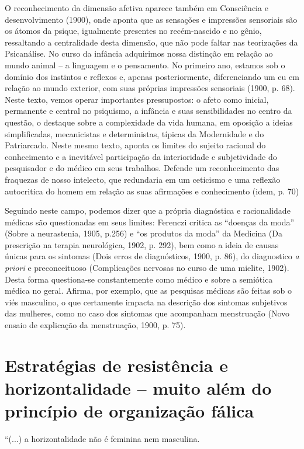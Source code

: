 O reconhecimento da dimensão afetiva aparece também em Consciência e
desenvolvimento (1900), onde aponta que as sensações e impressões
sensoriais são os átomos da psique, igualmente presentes no
recém-nascido e no gênio, ressaltando a centralidade desta dimensão, que
não pode faltar nas teorizações da Psicanálise. No curso da infância
adquirimos nossa distinção em relação ao mundo animal -- a linguagem e o
pensamento. No primeiro ano, estamos sob o domínio dos instintos e
reflexos e, apenas posteriormente, diferenciando um eu em relação ao
mundo exterior, com suas próprias impressões sensoriais (1900, p. 68).
Neste texto, vemos operar importantes pressupostos: o afeto como
inicial, permanente e central no psiquismo, a infância e suas
sensibilidades no centro da questão, o destaque sobre a complexidade da
vida humana, em oposição a ideias simplificadas, mecanicistas e
deterministas, típicas da Modernidade e do Patriarcado. Neste mesmo
texto, aponta os limites do sujeito racional do conhecimento e a
inevitável participação da interioridade e subjetividade do pesquisador
e do médico em seus trabalhos. Defende um reconhecimento das fraquezas
de nosso intelecto, que redundaria em um ceticismo e uma reflexão
autocritica do homem em relação as suas afirmações e conhecimento (idem,
p. 70)

Seguindo neste campo, podemos dizer que a própria diagnóstica e
racionalidade médicas são questionadas em seus limites: Ferenczi critica
as ``doenças da moda'' (Sobre a neurastenia, 1905, p.256) e ``os
produtos da moda'' da Medicina (Da prescrição na terapia neurológica,
1902, p. 292), bem como a ideia de causas únicas para os sintomas (Dois
erros de diagnósticos, 1900, p. 86), do diagnostico \emph{a priori} e
preconceituoso (Complicações nervosas no curso de uma mielite, 1902).
Desta forma questiona-se constantemente como médico e sobre a semiótica
médica no geral. Afirma, por exemplo, que as pesquisas médicas são
feitas sob o viés masculino, o que certamente impacta na descrição dos
sintomas subjetivos das mulheres, como no caso dos sintomas que
acompanham menstruação (Novo ensaio de explicação da menstruação, 1900,
p. 75).

\section{Estratégias de resistência e horizontalidade -- muito além do
princípio de organização fálica }

``(...) a horizontalidade não é feminina nem masculina.

